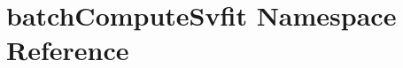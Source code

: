 \hypertarget{namespacebatchComputeSvfit}{
\section{batchComputeSvfit Namespace Reference}
\label{namespacebatchComputeSvfit}
}
